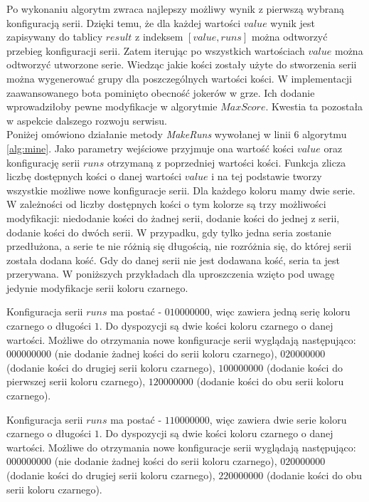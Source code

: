 Po wykonaniu algorytm zwraca najlepszy możliwy wynik z pierwszą wybraną konfiguracją serii. Dzięki temu, że dla każdej wartości $value$ wynik jest zapisywany do tablicy $result$ z indeksem $[value, runs]$ można odtworzyć przebieg konfiguracji serii. Zatem iterując po wszystkich wartościach $value$ można odtworzyć utworzone serie. Wiedząc jakie kości zostały użyte do stworzenia serii można wygenerować grupy dla poszczególnych wartości kości. W implementacji zaawansowanego bota pominięto obecność jokerów w grze. Ich dodanie wprowadziłoby pewne modyfikacje w algorytmie $MaxScore$. Kwestia ta pozostała w aspekcie dalszego rozwoju serwisu. \\

Poniżej omówiono działanie metody \emph{MakeRuns} wywołanej w linii 6 algorytmu \ref{alg:mine}.
Jako parametry wejściowe przyjmuje ona wartość kości $value$ oraz konfigurację serii $runs$ otrzymaną z poprzedniej wartości kości. 
Funkcja zlicza liczbę dostępnych kości o danej wartości $value$ i na tej podstawie tworzy wszystkie możliwe nowe konfiguracje serii. Dla każdego koloru mamy dwie serie. W zależności od liczby dostępnych kości o tym kolorze są trzy możliwości modyfikacji: niedodanie kości do żadnej serii, dodanie kości do jednej z serii, dodanie kości do dwóch serii. W przypadku, gdy tylko jedna seria zostanie przedłużona, a serie te nie różnią się długością, nie rozróżnia się, do której serii została dodana kość. Gdy do danej serii nie jest dodawana kość, seria ta jest przerywana. W poniższych przykładach dla uproszczenia wzięto pod uwagę jedynie modyfikacje serii koloru czarnego.

\begin{example}
	Konfiguracja serii $runs$  ma postać - $010000000$, więc zawiera jedną serię koloru czarnego o długości $1$. Do dyspozycji są dwie kości koloru czarnego o danej wartości. Możliwe do otrzymania nowe konfiguracje serii wyglądają następująco: $000000000$ (nie dodanie żadnej kości do serii koloru czarnego), $020000000$ (dodanie kości do drugiej serii koloru czarnego), $100000000$ (dodanie kości do pierwszej serii koloru czarnego), $120000000$ (dodanie kości do obu serii koloru czarnego). 
\end{example}

\begin{example}
Konfiguracja serii $runs$  ma postać - $110000000$, więc zawiera dwie serie koloru czarnego o długości $1$. Do dyspozycji są dwie kości koloru czarnego o danej wartości. Możliwe do otrzymania nowe konfiguracje serii wyglądają następująco: $000000000$ (nie dodanie żadnej kości do serii koloru czarnego), $020000000$ (dodanie kości do drugiej serii koloru czarnego), $220000000$ (dodanie kości do obu serii koloru czarnego). 
\end{example}

